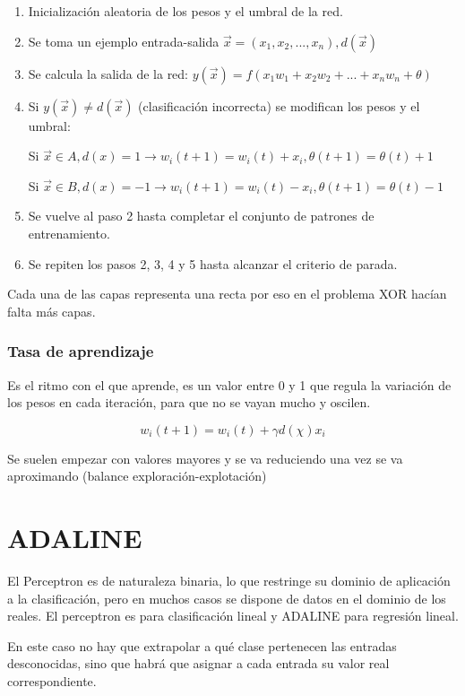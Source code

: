 \documentclass[12pt, twoside, openright]{report} %
\begin{document}
\begin{enumerate}
	\item Inicialización aleatoria de los pesos y el umbral de la red.
	\item Se toma un ejemplo entrada-salida $\vec{x} = (x_1, x_2, ..., x_n), d(\vec{x})$
	\item Se calcula la salida de la red: $y(\vec{x}) = f (x_1w_1 + x_2w_2 + ... + x_nw_n + \theta)$
	\item Si $y(\vec{x}) \neq d(\vec{x})$ (clasificación incorrecta) se modifican los pesos y el umbral:
	      
	      Si $\vec{x} \in A, d(x) = 1 \rightarrow w_i(t+1) = w_i(t)+x_i, \theta(t+1) = \theta(t)+1$
	      
	      Si $\vec{x} \in B, d(x) = -1 \rightarrow w_i(t+1) = w_i(t)-x_i, \theta(t+1) = \theta(t)-1$
	      
	\item Se vuelve al paso 2 hasta completar el conjunto de patrones de entrenamiento.
	\item Se repiten los pasos 2, 3, 4 y 5 hasta alcanzar el criterio de parada.
\end{enumerate}

Cada una de las capas representa una recta por eso en el problema XOR hacían falta más capas.

\subsubsection{Tasa de aprendizaje}
Es el ritmo con el que aprende, es un valor entre 0 y 1 que regula la variación de los pesos en cada iteración, para que no se vayan mucho y oscilen.

$$w_i(t+1)=w_i(t)+\gamma d(\chi)x_i$$

Se suelen empezar con valores mayores y se va reduciendo una vez se va aproximando (balance exploración-explotación)

\section{ADALINE}
El Perceptron es de naturaleza binaria, lo que restringe su dominio de aplicación a la clasificación, pero en muchos casos se dispone de datos en el dominio de los reales. El perceptron es para clasificación lineal y ADALINE para regresión lineal.

En este caso no hay que extrapolar a qué clase pertenecen las entradas desconocidas, sino que habrá que asignar a cada entrada su valor real correspondiente.
\end{document}
